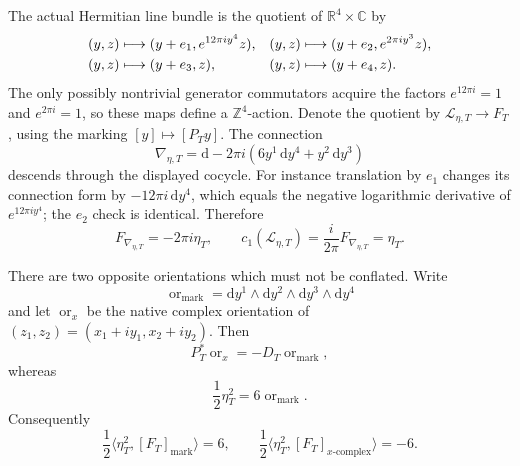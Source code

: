 The actual Hermitian line bundle is the quotient of
\(\mathbb R^4\times\mathbb C\) by
\begin{align}
 (y,z)&\longmapsto(y+e_1,e^{12\pi i y^4}z),&
 (y,z)&\longmapsto(y+e_2,e^{2\pi i y^3}z),
 \label{cusp-native-full-flux-cocycle}\\
 (y,z)&\longmapsto(y+e_3,z),&
 (y,z)&\longmapsto(y+e_4,z).
 \notag
\end{align}
The only possibly nontrivial generator commutators acquire the factors
\(e^{12\pi i}=1\) and \(e^{2\pi i}=1\), so these maps define a
\(\mathbb Z^4\)-action.  Denote the quotient by
\(\mathscr L_{\eta,T}\to F_T\), using the marking
\([y]\mapsto[P_Ty]\).  The connection
\begin{equation}
 \nabla_{\eta,T}
 =\mathrm d-2\pi i(6y^1\,\mathrm dy^4+y^2\,\mathrm dy^3)
 \label{cusp-native-full-flux-connection}
\end{equation}
descends through the displayed cocycle.  For instance translation by \(e_1\)
changes its connection form by \(-12\pi i\,\mathrm dy^4\), which equals the
negative logarithmic derivative of \(e^{12\pi i y^4}\); the \(e_2\) check is
identical.  Therefore
\begin{equation}
 F_{\nabla_{\eta,T}}=-2\pi i\eta_T,
 \qquad c_1(\mathscr L_{\eta,T})
 =\frac{i}{2\pi}F_{\nabla_{\eta,T}}=\eta_T.
 \label{cusp-native-full-flux-curvature}
\end{equation}

There are two opposite orientations which must not be conflated.  Write
\begin{equation}
 \operatorname{or}_{\mathrm{mark}}
 =\mathrm dy^1\wedge\mathrm dy^2\wedge
  \mathrm dy^3\wedge\mathrm dy^4
 \label{cusp-native-full-flux-marking-orientation}
\end{equation}
and let \(\operatorname{or}_{x}\) be the native complex orientation of
\((z_1,z_2)=(x_1+iy_1,x_2+iy_2)\).  Then
\begin{equation}
 P_T^*\operatorname{or}_{x}
 =-D_T\operatorname{or}_{\mathrm{mark}},
 \label{cusp-native-full-flux-orientation-reversal}
\end{equation}
whereas
\begin{equation}
 \frac12\eta_T^2=6\operatorname{or}_{\mathrm{mark}}.
 \label{cusp-native-full-flux-square}
\end{equation}
Consequently
\begin{equation}
 \frac12\langle\eta_T^2,[F_T]_{\mathrm{mark}}\rangle=6,
 \qquad
 \frac12\langle\eta_T^2,[F_T]_{x\text{-}\mathrm{complex}}\rangle=-6.
 \label{cusp-native-full-flux-two-orientation-pairings}
\end{equation}

